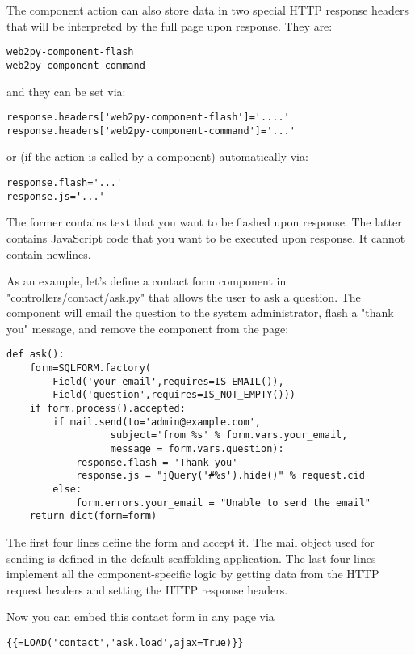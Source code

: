 \documentclass[justified,sixbynine,notoc]{tufte-book}
\begin{document}
\begin{fullwidth}
The component action can also store data in two special HTTP response headers that will be interpreted by the full page upon response. They are:

\begin{lstlisting}
web2py-component-flash
web2py-component-command
\end{lstlisting}
\noindent and they can be set via:

\begin{lstlisting}
response.headers['web2py-component-flash']='....'
response.headers['web2py-component-command']='...'
\end{lstlisting}
\noindent or (if the action is called by a component) automatically via:

\begin{lstlisting}
response.flash='...'
response.js='...'
\end{lstlisting}

The former contains text that you want to be flashed upon response.
The latter contains JavaScript code that you want to be executed upon response. It cannot contain newlines.

As an example, let's define a contact form component in "controllers/contact/ask.py" that allows the user to ask a question. The component will email the question to the system administrator, flash a "thank you" message, and remove the component from the page:

\begin{lstlisting}
def ask():
    form=SQLFORM.factory(
        Field('your_email',requires=IS_EMAIL()),
        Field('question',requires=IS_NOT_EMPTY()))
    if form.process().accepted:
        if mail.send(to='admin@example.com',
                  subject='from %s' % form.vars.your_email,
                  message = form.vars.question):
            response.flash = 'Thank you'
            response.js = "jQuery('#%s').hide()" % request.cid
        else:
            form.errors.your_email = "Unable to send the email"
    return dict(form=form)
\end{lstlisting}

The first four lines define the form and accept it. The mail object used for sending is defined in the default scaffolding application. The last four lines implement all the component-specific logic by getting data from the HTTP request headers and setting the HTTP response headers.

Now you can embed this contact form in any page via

\begin{lstlisting}[keywords={}]
{{=LOAD('contact','ask.load',ajax=True)}}
\end{lstlisting}


\end{fullwidth}
\end{document}
